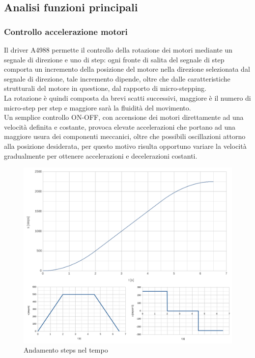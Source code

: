 \documentclass[12pt]{article}
\begin{document}
    \subsection{Analisi funzioni principali}
        \subsubsection{Controllo accelerazione motori}
        Il driver A4988 permette il controllo della rotazione dei motori mediante un se\-gna\-le di direzione e uno di step: ogni fronte di salita del se\-gna\-le di step comporta un incremento della posizione del motore nella direzione selezionata dal segnale di direzione, tale incremento dipende, oltre che dalle caratteristiche strutturali del motore in questione, dal rapporto di micro-stepping.\\
        La rotazione è quindi composta da brevi scatti successivi, maggiore è il numero di micro-step per step e maggiore sarà la fluidità del movimento.\\
        Un semplice controllo ON-OFF, con accensione dei motori direttamente ad una velocità definita e costante, provoca elevate accelerazioni che portano ad una maggiore usura dei componenti meccanici, oltre che possibili oscillazioni attorno alla posizione desiderata, per questo motivo risulta opportuno variare la velocità gra\-dual\-men\-te per ottenere accelerazioni e decelerazioni costanti.\\
        
        \begin{figure}[h]
        \centering
            \includegraphics[width=\textwidth-25pt]{Draws/Motors_s-v-a_block.png}
            \caption{Andamento steps nel tempo}
            \label{Steps_velocity_acceleration_in_time}
        \end{figure}
        
\end{document}
